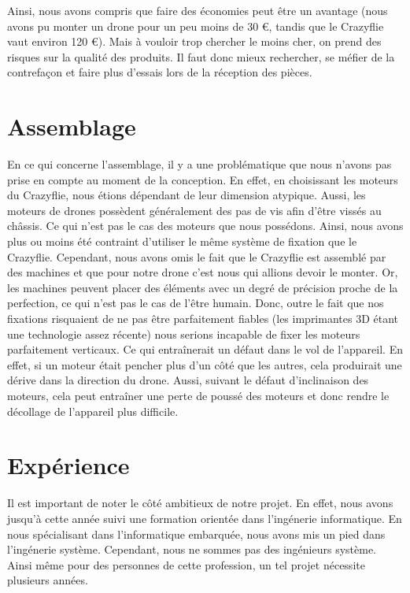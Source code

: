 \documentclass[a4paper,10pt]{report}
\begin{document}
      Ainsi, nous avons compris que faire des économies peut être un avantage 
(nous avons pu monter un drone pour un peu moins de 30 \euro, tandis que le 
Crazyflie vaut environ 120 \euro). Mais à vouloir trop chercher le moins cher, 
on prend des risques sur la qualité des produits. Il faut donc mieux 
rechercher, se méfier de la contrefaçon  et faire plus d'essais lors de la 
réception des pièces.
    
    \section{Assemblage}
      En ce qui concerne l'assemblage, il y a une problématique que nous 
n'avons pas prise en compte au moment de la conception. En effet, en 
choisissant les moteurs du Crazyflie, nous étions dépendant de leur dimension 
atypique. Aussi, les moteurs de drones possèdent généralement des pas de vis 
afin d'être vissés au châssis. Ce qui n'est pas le cas des moteurs que nous 
possédons. Ainsi, nous avons plus ou moins été contraint d'utiliser le même 
système de fixation que le Crazyflie. Cependant, nous avons omis le fait que le 
Crazyflie est assemblé par des machines et que pour notre drone c'est nous qui 
allions devoir le monter. Or, les machines peuvent placer des éléments avec un 
degré de précision proche de la perfection, ce qui n'est pas le cas de l'être 
humain. Donc, outre le fait que nos fixations risquaient de ne pas être 
parfaitement fiables (les imprimantes 3D étant une technologie assez récente) 
nous serions incapable de fixer les moteurs parfaitement verticaux. Ce qui 
entraînerait un défaut dans le vol de l'appareil. En effet, si un moteur était 
pencher plus d'un côté que les autres, cela produirait une dérive dans la 
direction du drone. Aussi, suivant le défaut d'inclinaison des moteurs, cela 
peut entraîner une perte de poussé des moteurs et donc rendre le décollage de 
l'appareil plus difficile.
    
    \section{Expérience}
      Il est important de noter le côté ambitieux de notre projet. En effet, 
nous avons jusqu'à cette année suivi une formation orientée dans l'ingénerie 
informatique. En nous spécialisant dans l'informatique embarquée, nous avons 
mis un pied dans l'ingénerie système. Cependant, nous ne sommes pas des 
ingénieurs système. Ainsi même pour des personnes de cette profession, un tel 
projet nécessite plusieurs années.
\end{document}
